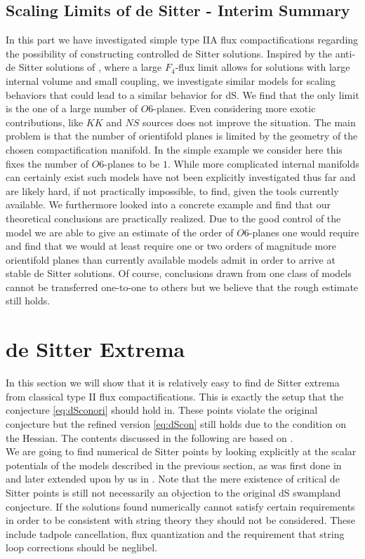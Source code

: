 \documentclass[a4paper,12pt]{report}
\begin{document}
\subsection{Scaling Limits of de Sitter - Interim Summary}
In this part we have investigated simple type IIA flux compactifications regarding the possibility of constructing controlled de Sitter solutions. Inspired by the anti-de Sitter solutions of \cite{DeWolfe:2005uu}, where a large $F_4$-flux limit allows for solutions with large internal volume and small coupling, we investigate similar models for scaling behaviors that could lead to a similar behavior for dS. We find that the only limit is the one of a large number of $O6$-planes. Even considering more exotic contributions, like $KK$ and $NS$ sources does not improve the situation. The main problem is that the number of orientifold planes is limited by the geometry of the chosen compactification manifold. In the simple example we consider here this fixes the number of $O6$-planes to be $1$. While more complicated internal manifolds can certainly exist such models have not been explicitly investigated thus far and are likely hard, if not practically impossible, to find, given the tools currently available. We furthermore looked into a concrete example and find that our theoretical conclusions are practically realized. Due to the good control of the model we are able to give an estimate of the order of $O6$-planes one would require and find that we would at least require one or two orders of magnitude more orientifold planes than currently available models admit in order to arrive at stable de Sitter solutions. Of course, conclusions drawn from one class of models cannot be transferred one-to-one to others but we believe that the rough estimate still holds.

\section{de Sitter Extrema}
\label{sec:dSextrema}
In this section we will show that it is relatively easy to find de Sitter extrema from classical type II flux compactifications. This is exactly the setup that the conjecture \eqref{eq:dSconori} should hold in. These points violate the original conjecture but the refined version \eqref{eq:dScon} still holds due to the condition on the Hessian. The contents discussed in the following are based on \cite{Roupec:2018mbn}.\\
We are going to find numerical de Sitter points by looking explicitly at the scalar potentials of the models described in the previous section, as was first done in \cite{Caviezel:2008tf,Flauger:2008ad} and later extended upon by us in \cite{Roupec:2018mbn}. Note that the mere existence of critical de Sitter points is still not necessarily an objection to the original dS swampland conjecture. If the solutions found numerically cannot satisfy certain requirements in order to be consistent with string theory they should not be considered. These include tadpole cancellation, flux quantization and the requirement that string loop corrections should be neglibel.
\end{document}
